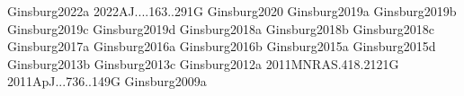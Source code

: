 \documentclass{article}
\begin{document}
























%



%

%
%
%
%
%
%
%
%
%
%
%
%
%
%
%
%
%
%
%








%

%




\nocite{biba}{Ginsburg2022a}
\nocite{biba}{2022AJ....163..291G}
\nocite{biba}{Ginsburg2020}
\nocite{biba}{Ginsburg2019a}
\nocite{biba}{Ginsburg2019b}
\nocite{biba}{Ginsburg2019c}
\nocite{biba}{Ginsburg2019d}
\nocite{biba}{Ginsburg2018a}
\nocite{biba}{Ginsburg2018b}
\nocite{biba}{Ginsburg2018c}
\nocite{biba}{Ginsburg2017a}
\nocite{biba}{Ginsburg2016a}
\nocite{biba}{Ginsburg2016b}
\nocite{biba}{Ginsburg2015a}
\nocite{biba}{Ginsburg2015d}
\nocite{biba}{Ginsburg2013b}
\nocite{biba}{Ginsburg2013c}
\nocite{biba}{Ginsburg2012a}
\nocite{biba}{2011MNRAS.418.2121G}
\nocite{biba}{2011ApJ...736..149G}
\nocite{biba}{Ginsburg2009a}
\end{document}
